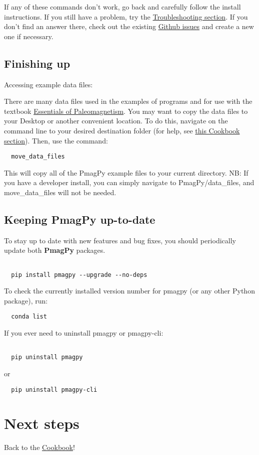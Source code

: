 \documentclass[11pt]{article}
\begin{document}
If any of these commands don't work, go back and carefully follow the install instructions.  If you still have a problem, try the \href{https://earthref.org/PmagPy/cookbook/#trouble}{Troubleshooting section}.  If you don't find an answer there, check out the existing \href{https://github.com/PmagPy/PmagPy/issues}{Github issues} and create a new one if necessary.

\subsection{Finishing up}

Accessing example data files:

   There are many data files used in the examples of programs and for use with the textbook  \href{http://earthref.org/MAGIC/books/Tauxe/Essentials/WebBook3.html}{Essentials of Paleomagnetism}.     You may want to copy  the data files to your Desktop or another convenient location.
   To do this, navigate on the command line to your desired destination folder (for help, see \href{https://earthref.org/PmagPy/cookbook/#file_system}{this Cookbook section}).  Then, use the command:

\begin{verbatim}
  move_data_files
\end{verbatim}

This will copy all of the PmagPy example files to your current directory.  NB: If you have a developer install, you can simply navigate to PmagPy/data\_files, and move\_data\_files will not be needed.


\subsection{Keeping PmagPy up-to-date}


To stay up to date with new features and bug fixes, you should periodically update both {\bf PmagPy} packages.
\begin{verbatim}

  pip install pmagpy --upgrade --no-deps
\end{verbatim}

To check the currently installed version number for pmagpy (or any other Python package), run:
\begin{verbatim}
  conda list
\end{verbatim}

If you ever need to uninstall pmagpy or pmagpy-cli:

\begin{verbatim}

  pip uninstall pmagpy
\end{verbatim}
  or
\begin{verbatim}
  pip uninstall pmagpy-cli
\end{verbatim}

\section{Next steps}

Back to the \href{https://earthref.org/PmagPy/cookbook/#next_steps}{Cookbook}!
\end{document}
